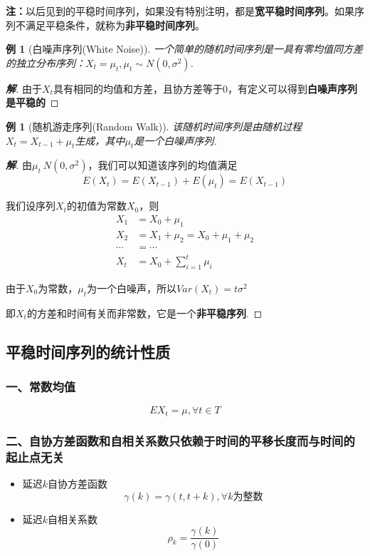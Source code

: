\documentclass[12pt, a4paper, oneside]{ctexbook}
\newtheorem{example}[theorem]{例}
\newcommand\jie[2]{\begin{proof}[\textbf{#1}]
    #2
\end{proof}}
\begin{document}
\textbf{注：}以后见到的平稳时间序列，如果没有特别注明，都是\textbf{宽平稳时间序列}。如果序列不满足平稳条件，就称为\textbf{非平稳时间序列}。
\begin{example}[白噪声序列(White Noise)]
    一个简单的随机时间序列是一具有零均值同方差的独立分布序列：$X_t=\mu_t,\mu_t\sim N(0,\sigma^2)$.
\end{example}
\jie{解}{由于$X_t$具有相同的均值和方差，且协方差等于0，有定义可以得到\textbf{白噪声序列是平稳的}}

\begin{example}[随机游走序列(Random Walk)]
    该随机时间序列是由随机过程$X_t=X_{t-1}+\mu_t$生成，其中$\mu_t$是一个白噪声序列.
\end{example}
\jie{解}{由$\mu_t~N(0,\sigma^2)$，我们可以知道该序列的均值满足
    \begin{equation*}
        E(X_t) = E(X_{t-1}) + E(\mu_t) = E(X_{t-1})
    \end{equation*}
    \par 我们设序列$X_t$的初值为常数$X_0$，则
    \begin{equation*}
        \begin{aligned}
            X_1    & = X_0 + \mu_1                       \\
            X_2    & = X_1 + \mu_2 = X_0 + \mu_1 + \mu_2 \\
            \cdots & = \cdots                            \\
            X_t    & = X_0 + \sum_{i=1}^{t}\mu_i
        \end{aligned}
    \end{equation*}

    由于$X_0$为常数，$\mu_t$为一个白噪声，所以$Var(X_t)=t\sigma^2$

    即$X_t$的方差和时间有关而非常数，它是一个\textbf{非平稳序列}.
}
\subsection{平稳时间序列的统计性质}
\subsubsection{一、常数均值}
\begin{equation}
    EX_t = \mu,\forall t \in T
\end{equation}
\subsubsection{二、自协方差函数和自相关系数只依赖于时间的平移长度而与时间的起止点无关}
\begin{itemize}
    \item 延迟$k$自协方差函数
          \begin{equation}
              \gamma(k)=\gamma(t,t+k),\forall k\text{为整数}
          \end{equation}
    \item 延迟$k$自相关系数
          \begin{equation}\label{eq2.5}
              \rho_k=\frac{\gamma(k)}{\gamma(0)}
          \end{equation}
\end{itemize}
\end{document}
